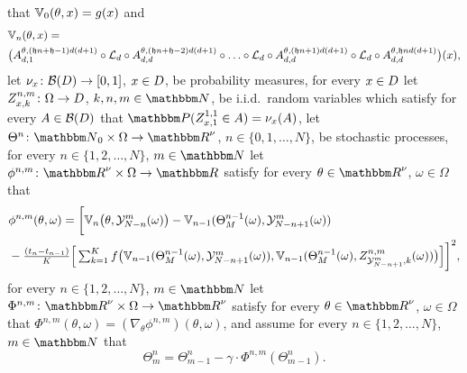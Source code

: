 \begin{algo}
	that
	${\mathbb{V}}_0(\theta,x) = g(x)$
	and
	\begin{align}
	\label{eq:neural_network_for_a_generalCase}
	& {\mathbb{V}}_{ n }(\theta,x)
	= \\
	& \big(A^{ \theta, (\mathfrak{h}n+\mathfrak{h}-1)d(d+1) }_{ d, 1 }
	\circ
	\mathcal{L}_d
	\circ
	A^{ \theta, (\mathfrak{h}n+\mathfrak{h}-2)d(d+1) }_{ d, d }
	\circ
	\ldots
	\circ
	\mathcal{L}_d
	\circ
	A^{ \theta, (\mathfrak{h}n+1)d(d+1) }_{ d, d }
	\circ
	\mathcal{L}_d
	\circ
	A^{ \theta, \mathfrak{h}nd(d+1) }_{ d, d }\big)(x)
	, \nonumber
	\end{align}
	let
	$\nu_x \colon \mathcal{B}( D )\to [0,1]$,
	$x \in D$,
	be probability measures, for every
	$x \in D$
	let
	$Z^{ n, m }_{ x, k } \colon \Omega \to D$,
	$k, n, m \in \N$,
	be i.i.d.\ random variables which satisfy for every
	$ A \in \mathcal{B}( D ) $
	that
	$\P( Z_{ x, 1 }^{ 1, 1 } \in A ) = \nu_x( A )$,
	let
	$\Theta^{n}\colon \N_0\times\Omega\to\R^{\nu}$, $n \in \{0,1,\ldots,N\}$,
	be  stochastic processes,
	for every $n \in \{1,2,\ldots,N\}$, $m\in \N$
	let
	$\phi^{n,m}\colon\R^{\nu}\times\Omega\to\R$
	satisfy for every
	$\theta\in\R^{\nu}$, $\omega\in\Omega$
	that
	\begin{equation}
	\label{eq:loss_special_case}
	\begin{split}
	&\phi^{n,m}(\theta,\omega)
	= \bigg[ \bV_n\big(\theta,\Y^{m}_{N-n}(\omega)\big) - \bV_{n-1}(\Theta^{n-1}_M(\omega),\Y^{m}_{N-n+1}(\omega))\\
	& - \tfrac{(t_{n}-t_{n-1})}{K} \Big[ \textstyle \sum_{k=1}^{K}  f\big(\bV_{n-1}(\Theta^{n-1}_M(\omega),\Y^{m}_{N-n+1}(\omega)),\bV_{n-1}(\Theta^{n-1}_M(\omega),Z_{ \mathcal{Y}^m_{ N - n + 1 }, k }^{ n, m }(\omega)) \big) \Big] \bigg]^2, %
	\end{split}
	\end{equation}
	for every
	$n\in\{1,2,\ldots,N\}$,
	$m\in\N$
	let
	$\Phi^{n,m}\colon\R^{\nu}\times\Omega\to\R^{\nu}$
	satisfy for every
	$\theta\in\R^{\nu}$,
	$\omega\in\Omega$
	that
	$\Phi^{n,m}(\theta,\omega) = (\nabla_{\theta}\phi^{n,m})(\theta,\omega)$,
	and assume for every
	$n\in\{1,2,\ldots,N\}$,
	$m\in\N$
	that
	\begin{equation}
	\label{eq:plain-vanilla-SGD}
	\Theta^{n}_{m} = \Theta^{n}_{m-1} - \gamma\cdot\Phi^{n,m}(\Theta^{n}_{m-1}).
	\end{equation}
\end{algo}
